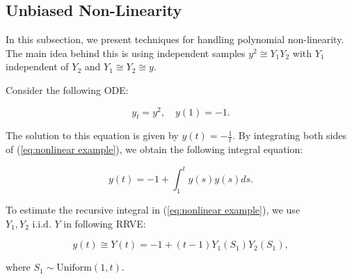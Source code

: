 \documentclass[a4paper,12pt]{article}
\begin{document}
\subsection{Unbiased Non-Linearity}

In this subsection, we present techniques for handling polynomial non-linearity.
The main idea behind this is using independent samples
$y^{2} \cong Y_{1} Y_{2}$ with $Y_{1}$ independent of $ Y_{2}$ and
$Y_{1} \cong Y_{2} \cong y$.


\begin{example}[$y_t=y^{2}$] \label{ex:nonlinear example}
    Consider the following ODE:

    \begin{equation} \label{eq:nonlinear example}
        y_t = y^2, \quad y(1) = -1.
    \end{equation}

    The solution to this equation is given by $y(t) = -\frac{1}{t}$.
    By integrating both sides of (\ref{eq:nonlinear example}),
    we obtain the following integral equation:

    \begin{equation}
        y(t) = -1 + \int_{1}^{t} y(s) y(s)ds.
    \end{equation}

    To estimate the recursive integral in (\ref{eq:nonlinear example}),
    we use  $Y_1,Y_2 \text{ i.i.d. } Y$ in following RRVE:

    \begin{equation} \label{RRVE: nonlinear example}
        y(t) \cong Y(t) = -1 + (t-1) Y_1(S_{1}) Y_2(S_{1}),
    \end{equation}

    where $S_{1} \sim \text{Uniform}(1,t)$.
\end{example}

\end{document}
